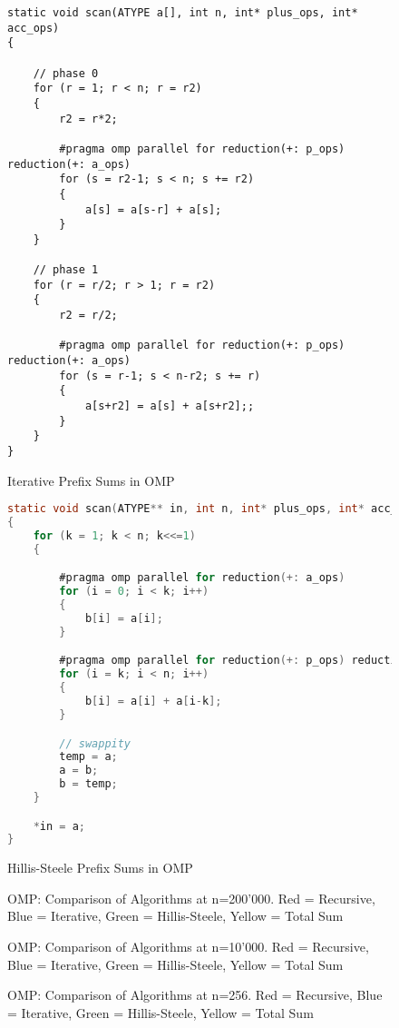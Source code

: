 \documentclass[11pt]{article}
\begin{document}
\begin{figure}[h]
\label{omp_prefix_iterative_code}
\caption{Iterative Prefix Sums in OMP}

\begin{lstlisting}
static void scan(ATYPE a[], int n, int* plus_ops, int* acc_ops)
{

	// phase 0
	for (r = 1; r < n; r = r2)
	{
		r2 = r*2;

		#pragma omp parallel for reduction(+: p_ops) reduction(+: a_ops)
		for (s = r2-1; s < n; s += r2)
		{
			a[s] = a[s-r] + a[s];
		}
	}

	// phase 1
	for (r = r/2; r > 1; r = r2)
	{
		r2 = r/2;

		#pragma omp parallel for reduction(+: p_ops) reduction(+: a_ops)
		for (s = r-1; s < n-r2; s += r)
		{
			a[s+r2] = a[s] + a[s+r2];;
		}
	}
}
\end{lstlisting}
\end{figure}


\begin{figure}[h]
\label{omp_prefix_hillis_steele_code}
\caption{Hillis-Steele Prefix Sums in OMP}

\begin{lstlisting}[language=C]
static void scan(ATYPE** in, int n, int* plus_ops, int* acc_ops)
{
	for (k = 1; k < n; k<<=1) 
	{

		#pragma omp parallel for reduction(+: a_ops)
		for (i = 0; i < k; i++)
		{
			b[i] = a[i];
		}

		#pragma omp parallel for reduction(+: p_ops) reduction(+: a_ops)
		for (i = k; i < n; i++)
		{
			b[i] = a[i] + a[i-k];
		}

		// swappity
		temp = a;
		a = b;
		b = temp;
	}

	*in = a;
}
\end{lstlisting}
\end{figure}

\begin{figure}
\caption{OMP: Comparison of Algorithms at n=200'000. Red = Recursive, Blue = Iterative, 
Green = Hillis-Steele, Yellow = Total Sum}


\end{figure}

\begin{figure}
\caption{OMP: Comparison of Algorithms at n=10'000. Red = Recursive, Blue = Iterative, 
Green = Hillis-Steele, Yellow = Total Sum}
\end{figure}

\begin{figure}
\caption{OMP: Comparison of Algorithms at n=256. Red = Recursive, Blue = Iterative, 
Green = Hillis-Steele, Yellow = Total Sum}
\end{figure}
\end{document}
